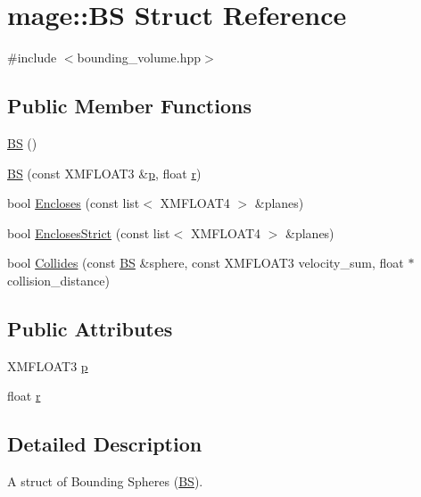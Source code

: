 \hypertarget{structmage_1_1_b_s}{}\section{mage\+:\+:BS Struct Reference}
\label{structmage_1_1_b_s}


{\ttfamily \#include $<$bounding\+\_\+volume.\+hpp$>$}

\subsection*{Public Member Functions}
\begin{DoxyCompactItemize}
\item 
\hyperlink{structmage_1_1_b_s_aa34921d9ea23b9a724ddf739b3adabfa}{BS} ()
\item 
\hyperlink{structmage_1_1_b_s_a53685c01f65431dd31e5f7088df21141}{BS} (const X\+M\+F\+L\+O\+A\+T3 \&\hyperlink{structmage_1_1_b_s_a30aa87318e657d71ae36e197136d59d2}{p}, float \hyperlink{structmage_1_1_b_s_ab2e786e8493feb28a3bc0216e8dea5bc}{r})
\item 
bool \hyperlink{structmage_1_1_b_s_aa2c1e7909151f919c7793fffeb3f6bcb}{Encloses} (const list$<$ X\+M\+F\+L\+O\+A\+T4 $>$ \&planes)
\item 
bool \hyperlink{structmage_1_1_b_s_a10d92e1fea87c26265ae4005480823e3}{Encloses\+Strict} (const list$<$ X\+M\+F\+L\+O\+A\+T4 $>$ \&planes)
\item 
bool \hyperlink{structmage_1_1_b_s_af036f3755936125b141184647d33e88b}{Collides} (const \hyperlink{structmage_1_1_b_s}{BS} \&sphere, const X\+M\+F\+L\+O\+A\+T3 velocity\+\_\+sum, float $\ast$collision\+\_\+distance)
\end{DoxyCompactItemize}
\subsection*{Public Attributes}
\begin{DoxyCompactItemize}
\item 
X\+M\+F\+L\+O\+A\+T3 \hyperlink{structmage_1_1_b_s_a30aa87318e657d71ae36e197136d59d2}{p}
\item 
float \hyperlink{structmage_1_1_b_s_ab2e786e8493feb28a3bc0216e8dea5bc}{r}
\end{DoxyCompactItemize}


\subsection{Detailed Description}
A struct of Bounding Spheres (\hyperlink{structmage_1_1_b_s}{BS}). 

